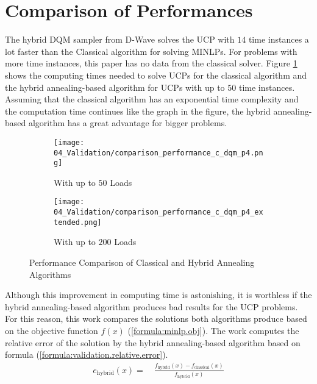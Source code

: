 \section{Comparison of Performances}
\label{validation:comparison}

The hybrid DQM sampler from D-Wave solves the UCP with $14$ time instances a lot faster than the Classical algorithm for solving MINLPs.
For problems with more time instances, this paper has no data from the classical solver.
Figure \ref{figure:validation.comparison.performance} shows the computing times needed to solve UCPs for the classical algorithm and the hybrid annealing-based algorithm for UCPs with up to $50$ time instances.
Assuming that the classical algorithm has an exponential time complexity and the computation time continues like the graph in the figure, the hybrid annealing-based algorithm has a great advantage for bigger problems.

\begin{figure}
  \begin{subfigure}[b]{0.5 \textwidth}
    \centering
    \texttt{[image: 04\_Validation/comparison\_performance\_c\_dqm\_p4.png]}
    \caption{With up to $50$ Loads}
    \label{figure:validation.comparison.performance}
  \end{subfigure}
  \begin{subfigure}[b]{0.5 \textwidth}
    \centering
    \texttt{[image: 04\_Validation/comparison\_performance\_c\_dqm\_p4\_extended.png]}
    \caption{With up to $200$ Loads}
    \label{figure:validation.comparison.performance.extended}
  \end{subfigure}
  \caption{Performance Comparison of Classical and Hybrid Annealing Algorithms}
\end{figure}

Although this improvement in computing time is astonishing, it is worthless if the hybrid annealing-based algorithm produces bad results for the UCP problems.
For this reason, this work compares the solutions both algorithms produce based on the objective function $f(x)$ (\ref{formula:minlp.obj}).
The work computes the relative error of the solution by the hybrid annealing-based algorithm based on formula (\ref{formula:validation.relative.error}).
\begin{align}
  \label{formula:validation.relative.error}
  e_{\text{hybrid}}(x) = \quad \frac{f_{\text{hybrid}}(x) - f_{\text{classical}}(x)}{f_{\text{hybrid}}(x)}
\end{align}

